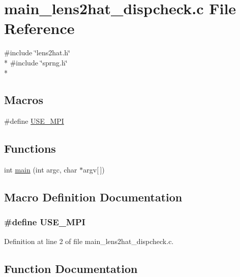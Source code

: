 \section{main\-\_\-lens2hat\-\_\-dispcheck.\-c File Reference}
\label{main__lens2hat__dispcheck_8c}
{\ttfamily \#include \char`\"{}lens2hat.\-h\char`\"{}}\\*
{\ttfamily \#include \char`\"{}sprng.\-h\char`\"{}}\\*
\subsection*{Macros}
\begin{DoxyCompactItemize}
\item 
\#define \hyperlink{main__lens2hat__dispcheck_8c_a3869d282031f6ea6b50fdb980b758420}{U\-S\-E\-\_\-\-M\-P\-I}
\end{DoxyCompactItemize}
\subsection*{Functions}
\begin{DoxyCompactItemize}
\item 
int \hyperlink{main__lens2hat__dispcheck_8c_a0ddf1224851353fc92bfbff6f499fa97}{main} (int argc, char $\ast$argv\mbox{[}$\,$\mbox{]})
\end{DoxyCompactItemize}


\subsection{Macro Definition Documentation}
\subsubsection[{U\-S\-E\-\_\-\-M\-P\-I}]{\setlength{\rightskip}{0pt plus 5cm}\#define U\-S\-E\-\_\-\-M\-P\-I}\label{main__lens2hat__dispcheck_8c_a3869d282031f6ea6b50fdb980b758420}


Definition at line 2 of file main\-\_\-lens2hat\-\_\-dispcheck.\-c.



\subsection{Function Documentation}
